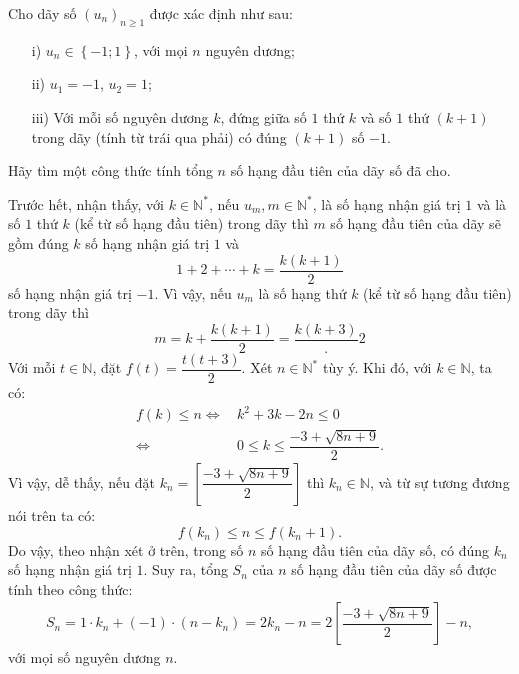 \begin{bt}%
	Cho dãy số $(u_n)_{n\geqslant1}$ được xác định như sau:
	\begin{enumerate}
		\item[i)] $u_n\in \left\lbrace -1;1\right\rbrace$, với mọi $n$ nguyên dương;
		\item[ii)] $u_1=-1$, $u_2=1$;
		\item[iii)] Với mỗi số nguyên dương $k$, đứng giữa số $1$ thứ $k$ và số $1$ thứ $(k+1)$ trong dãy (tính từ trái qua phải) có đúng $(k+1)$ số $-1$.
	\end{enumerate}
	Hãy tìm một công thức tính tổng $n$ số hạng đầu tiên của dãy số đã cho.
	\loigiai
	{%
		Trước hết, nhận thấy, với $k\in \mathbb{N^*}$, nếu $u_m,m\in\mathbb{N^*}$, là số hạng nhận giá trị $1$ và là số $1$ thứ $k$ (kể từ số hạng đầu tiên) trong dãy thì $m$ số hạng đầu tiên của dãy sẽ gồm đúng $k$ số hạng nhận giá trị $1$ và
		\[1+2+\cdots+k=\dfrac{k(k+1)}{2}\]
		số hạng nhận giá trị $-1$. Vì vậy, nếu $u_m$ là số hạng thứ $k$ (kể từ số hạng đầu tiên) trong dãy thì
		\[m=k+\dfrac{k(k+1)}{2}=\dfrac{k(k+3)}.{2}\]
		Với mỗi $t\in \mathbb{N}$, đặt $f(t)=\dfrac{t(t+3)}{2}$.
		Xét $n\in \mathbb{N^*}$ tùy ý. Khi đó, với $k\in \mathbb{N}$, ta có:
		{\allowdisplaybreaks
			\begin{align*}
			f(k)\leqslant n \Leftrightarrow \,& k^2+3k-2n \leqslant 0\\
			\Leftrightarrow \,& 0 \leqslant k \leqslant \dfrac{-3+\sqrt{8n+9}}{2}.
			\end{align*}}
		Vì vậy, dễ thấy, nếu đặt $k_n=\left[\dfrac{-3+\sqrt{8n+9}}{2}\right]$ thì $k_n \in \mathbb{N}$, và từ sự tương đương nói trên ta có:
		\[f(k_n)\leqslant n\leqslant f(k_n+1).\]
		Do vậy, theo nhận xét ở trên, trong số $n$ số hạng đầu tiên của dãy số, có đúng $k_n$ số hạng nhận giá trị $1$. Suy ra, tổng $S_n$ của $n$ số hạng đầu tiên của dãy số được tính theo công thức:
		{\allowdisplaybreaks
			\begin{align*}
			S_n=1\cdot k_n+(-1)\cdot (n-k_n)=2k_n-n=2\left[\dfrac{-3+\sqrt{8n+9}}{2}\right]-n,
			\end{align*}}
		với mọi số nguyên dương $n$.
		\begin{nx}

\end{nx}}
\end{bt}
